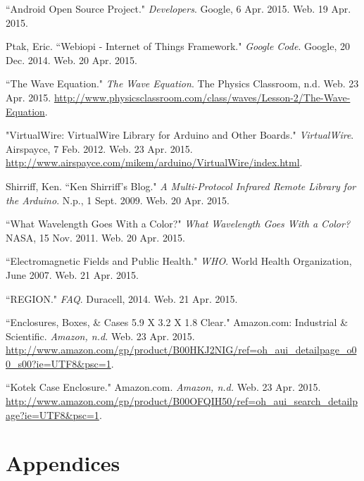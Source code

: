 \documentclass[12pt]{article}
\begin{document}
\newpage

\begin{thebibliography}{9}
  ``Android Open Source Project."
 \emph{Developers}.
  Google, 6 Apr. 2015.
  Web. 19 Apr. 2015.
  
 Ptak, Eric. 
 ``Webiopi - Internet of Things Framework." 
 \emph{Google Code}. 
 Google, 20 Dec. 2014. 
 Web. 20 Apr. 2015.
 
``The Wave Equation." 
\emph{The Wave Equation}. 
The Physics Classroom, n.d. 
Web. 23 Apr. 2015. 
\url{http://www.physicsclassroom.com/class/waves/Lesson-2/The-Wave-Equation}. 
 
"VirtualWire: VirtualWire Library for Arduino and Other Boards." 
\emph{VirtualWire}. 
Airspayce, 7 Feb. 2012. 
Web.
23 Apr. 2015.
\url{http://www.airspayce.com/mikem/arduino/VirtualWire/index.html}.
 
Shirriff, Ken. 
``Ken Shirriff's Blog." 
\emph{A Multi-Protocol Infrared Remote Library for the Arduino}. 
N.p., 1 Sept. 2009. 
Web. 20 Apr. 2015. 
 
  ``What Wavelength Goes With a Color?" 
  \emph{What Wavelength Goes With a Color?}
  NASA, 15 Nov. 2011. 
  Web. 
  20 Apr. 2015.

``Electromagnetic Fields and Public Health." 
\emph{WHO}. 
World Health Organization, June 2007. 
Web. 
21 Apr. 2015.

``REGION." 
\emph{FAQ}. 
Duracell, 2014. 
Web. 
21 Apr. 2015. 

``Enclosures, Boxes, \& Cases 5.9 X 3.2 X 1.8 Clear." Amazon.com: Industrial \& Scientific. 
\emph{Amazon, n.d.} 
Web. 23 Apr. 2015. 
\url{http://www.amazon.com/gp/product/B00HKJ2NIG/ref=oh_aui_detailpage_o00_s00?ie=UTF8\&psc=1}.

``Kotek Case Enclosure." 
Amazon.com. 
\emph{Amazon, n.d.} 
Web. 23 Apr. 2015. 
\url{http://www.amazon.com/gp/product/B00OFQIH50/ref=oh_aui_search_detailpage?ie=UTF8\&psc=1}.

\end{thebibliography}

\newpage

\section*{Appendices}
\end{document}
